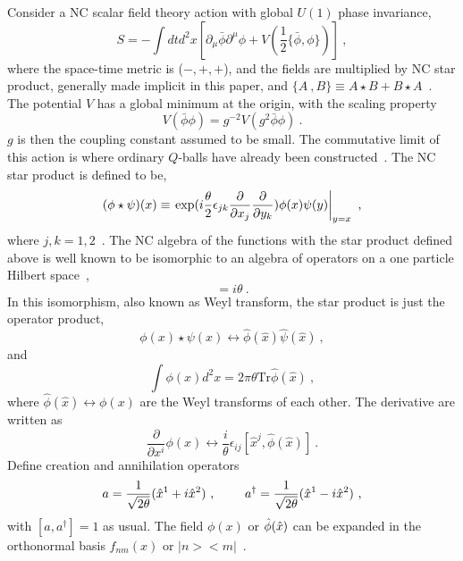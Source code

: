 \documentclass[a4paper,a4paper]{article}
\begin{document}
Consider a NC scalar field theory action with global $U(1)$ phase
invariance,
\begin{equation}
S=-\int
dtd^2x\left[\partial_\mu\bar{\phi}\partial^\mu\phi+V(\frac 12\{\bar{\phi},\phi\})\right]\
,                                                                                               \label{action}
\end{equation}
where the space-time metric is ($-,+,+$), and the fields are
multiplied by NC star product, generally made implicit in this
paper, and $\{A\ ,B\}\equiv A\star B+B\star A$\ . 
The potential $V$ has a global minimum at the origin, with the scaling property
\begin{equation}
  V(\bar{\phi}\phi)=g^{-2}V(g^2\bar{\phi}\phi)\ .                                         \label{ScalePot} 
\end{equation}
$g$ is then the coupling constant assumed to be small. 
The commutative limit of this action is where ordinary $Q$-balls have
already been constructed~\cite{LeeReport,Coleman}. The NC star product is defined to
be,
\begin{equation}
(\phi\star\psi)(x)\equiv\left.\hbox{exp}(i\frac\theta
2\epsilon_{jk}\frac\partial{\partial x_j}\frac\partial{\partial
y_k})\phi(x)\psi(y)\right|_{y=x}\ ,                                                        \label{Star}  
\end{equation} where $j,k=1,2$\ .
The NC algebra of the functions with the star product defined above is
well known to be isomorphic to an algebra of operators on a one particle Hilbert space~\cite{Zachos},
\begin{equation}
[\hat{x}^1\ ,\ \hat{x}^2]=i\theta\ .
\end{equation}
In this isomorphism, also known as Weyl transform, the star product 
is just the operator product,
\begin{equation}
\phi(x)\star\psi(x)\longleftrightarrow
\hat{\phi}(\hat{x})\hat{\psi}(\hat{x})\ ,
\end{equation}
and
\begin{equation}
\int\phi(x)d^2x=2\pi\theta\mbox{Tr}\hat{\phi}(\hat{x})\ ,
\end{equation}
where $\hat{\phi}(\hat{x})\leftrightarrow\phi(x)$ are 
the Weyl transforms of each other.
The derivative are written as
\begin{equation}
\frac\partial{\partial x^i}\phi(x)\longleftrightarrow \frac
i\theta\epsilon_{ij}[\hat{x}^j,\hat{\phi}(\hat{x})]\ .
\end{equation}
Define creation and annihilation operators
\begin{equation} 
a=\frac 1{\sqrt{2\theta}}(\hat{x}^1+i\hat{x}^2)\ ,\qquad\ a^\dag=\frac
1{\sqrt{2\theta}}(\hat{x}^1-i\hx^2)\ ,
\end{equation}
with $[a,a^\dag]=1$ as usual. The field $\phi(x)$ or $\hat{\phi}(\hat{x})$ 
can be expanded in the orthonormal basis $f_{nm}(x)$ or $|n><m|$~\cite{Komba}. 
\end{document}
